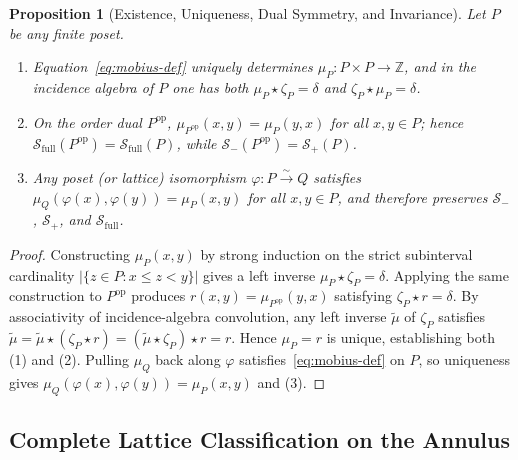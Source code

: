 \documentclass[11pt]{article}
\newtheorem{proposition}[theorem]{Proposition}
\theoremstyle{definition}
\begin{document}
\begin{proposition}[Existence, Uniqueness, Dual Symmetry, and Invariance]\label{prop:mobius-basic}
Let $P$ be any finite poset.
\begin{enumerate}
  \item Equation~\eqref{eq:mobius-def} uniquely determines $\mu_P : P \times P \to \mathbb{Z}$, and in the incidence algebra of $P$ one has both $\mu_P \star \zeta_P = \delta$ and $\zeta_P \star \mu_P = \delta$.
  \item On the order dual $P^{\mathrm{op}}$, $\mu_{P^{\mathrm{op}}}(x, y) = \mu_P(y, x)$ for all $x, y \in P$; hence $\mathcal{S}_{\mathrm{full}}(P^{\mathrm{op}}) = \mathcal{S}_{\mathrm{full}}(P)$, while $\mathcal{S}_-(P^{\mathrm{op}}) = \mathcal{S}_+(P)$.
  \item Any poset (or lattice) isomorphism $\varphi : P \xrightarrow{\sim} Q$ satisfies $\mu_Q(\varphi(x), \varphi(y)) = \mu_P(x, y)$ for all $x, y \in P$, and therefore preserves $\mathcal{S}_-$, $\mathcal{S}_+$, and $\mathcal{S}_{\mathrm{full}}$.
\end{enumerate}
\end{proposition}
\begin{proof}
Constructing $\mu_P(x,y)$ by strong induction on the strict subinterval cardinality $|\{z \in P : x \le z < y\}|$ gives a left inverse $\mu_P \star \zeta_P = \delta$. Applying the same construction to $P^{\mathrm{op}}$ produces $r(x,y) = \mu_{P^{\mathrm{op}}}(y,x)$ satisfying $\zeta_P \star r = \delta$. By associativity of incidence-algebra convolution, any left inverse $\tilde{\mu}$ of $\zeta_P$ satisfies $\tilde{\mu} = \tilde{\mu} \star (\zeta_P \star r) = (\tilde{\mu} \star \zeta_P) \star r = r$. Hence $\mu_P = r$ is unique, establishing both (1) and (2). Pulling $\mu_Q$ back along $\varphi$ satisfies~\eqref{eq:mobius-def} on $P$, so uniqueness gives $\mu_Q(\varphi(x),\varphi(y)) = \mu_P(x,y)$ and (3).
\end{proof}

\subsection{Complete Lattice Classification on the Annulus}
\end{document}
